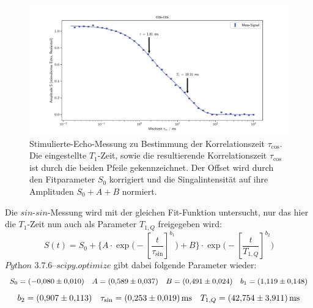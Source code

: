 \begin{figure}[H]
    \centering
    \includegraphics[width=\textwidth]{Auswertung/Para_der_Korrfkt/cos_cos.pdf}
    \caption{Stimulierte-Echo-Messung zu Bestimmung der Korrelationszeit
    $\tau_{\text{cos}}$. Die eingestellte $T_1$-Zeit, sowie die resultierende
    Korrelationszeit $\tau_{\text{cos}}$ ist durch die beiden Pfeile gekennzeichnet.
    Der Offset wird durch den Fitparameter $S_0$ korrigiert und die
    Singalintensität auf ihre Amplituden $S_0+A+B$ normiert.}
    \label{fig:cos}
\end{figure}
\noindent
Die $sin$-$sin$-Messung wird mit der gleichen Fit-Funktion untersucht, nur das hier die $T_1$-Zeit nun auch als Parameter $T_{1,Q}$ freigegeben wird:
\begin{equation*}
  S(t) = S_0 + \biggl\{
  A \cdot \exp\biggl(-\left[\frac{t}{\tau_{\text{sin}}} \right]^{b_1}
  \biggr) + B
  \biggr\} \cdot
  \exp\biggl(-\left[\frac{t}{T_{1,Q}} \right]^{b_2}
  \biggr)
\end{equation*}
\noindent
$\textit{Python 3.7.6--scipy.optimize}$ gibt dabei folgende Parameter wieder:
\begin{equation*}
  S_0 = \SI{-0.080\pm0.010}{}
  \quad
  A   = \SI{0.589\pm0.037}{}
  \quad
  B   = \SI{0.491\pm0.024}{}
  \quad
  b_1 = \SI{1,119\pm0.148}{}
\end{equation*}
\begin{equation*}
  b_2 = \SI{0,907\pm0,113}{}
  \quad
  \tau_{\text{sin}} = \SI{0,253\pm0,019}{\milli\second}
  \quad
  T_{1,Q} = \SI{42,754\pm3,911}{\milli\second}
\end{equation*}

